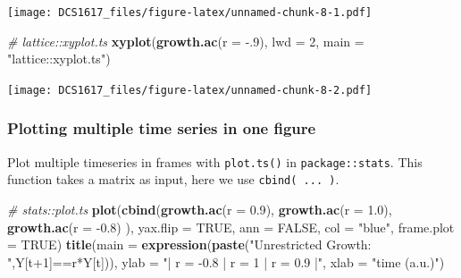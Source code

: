 \documentclass[]{book}
\newenvironment{Shaded}{\begin{snugshade}}{\end{snugshade}}
\newcommand{\KeywordTok}[1]{\textcolor[rgb]{0.13,0.29,0.53}{\textbf{{#1}}}}
\newcommand{\DataTypeTok}[1]{\textcolor[rgb]{0.13,0.29,0.53}{{#1}}}
\newcommand{\DecValTok}[1]{\textcolor[rgb]{0.00,0.00,0.81}{{#1}}}
\newcommand{\FloatTok}[1]{\textcolor[rgb]{0.00,0.00,0.81}{{#1}}}
\newcommand{\StringTok}[1]{\textcolor[rgb]{0.31,0.60,0.02}{{#1}}}
\newcommand{\CommentTok}[1]{\textcolor[rgb]{0.56,0.35,0.01}{\textit{{#1}}}}
\newcommand{\OtherTok}[1]{\textcolor[rgb]{0.56,0.35,0.01}{{#1}}}
\newcommand{\NormalTok}[1]{{#1}}
\begin{document}
\texttt{[image: DCS1617\_files/figure-latex/unnamed-chunk-8-1.pdf]}

\begin{Shaded}
\begin{Highlighting}[]
\CommentTok{# lattice::xyplot.ts}
\KeywordTok{xyplot}\NormalTok{(}\KeywordTok{growth.ac}\NormalTok{(}\DataTypeTok{r =} \NormalTok{-.}\DecValTok{9}\NormalTok{), }\DataTypeTok{lwd =} \DecValTok{2}\NormalTok{, }\DataTypeTok{main =} \StringTok{"lattice::xyplot.ts"}\NormalTok{)}
\end{Highlighting}
\end{Shaded}

\texttt{[image: DCS1617\_files/figure-latex/unnamed-chunk-8-2.pdf]}

\subsubsection*{Plotting multiple time series in one
figure}\label{plotting-multiple-time-series-in-one-figure}

Plot multiple timeseries in frames with \texttt{plot.ts()} in
\texttt{package::stats}. This function takes a matrix as input, here we
use \texttt{cbind(\ ...\ )}.

\begin{Shaded}
\begin{Highlighting}[]
\CommentTok{# stats::plot.ts  }
\KeywordTok{plot}\NormalTok{(}\KeywordTok{cbind}\NormalTok{(}\KeywordTok{growth.ac}\NormalTok{(}\DataTypeTok{r =}  \FloatTok{0.9}\NormalTok{),}
           \KeywordTok{growth.ac}\NormalTok{(}\DataTypeTok{r =}  \FloatTok{1.0}\NormalTok{), }
           \KeywordTok{growth.ac}\NormalTok{(}\DataTypeTok{r =} \NormalTok{-}\FloatTok{0.8}\NormalTok{)}
           \NormalTok{), }
     \DataTypeTok{yax.flip =} \OtherTok{TRUE}\NormalTok{, }\DataTypeTok{ann =} \OtherTok{FALSE}\NormalTok{, }\DataTypeTok{col =} \StringTok{"blue"}\NormalTok{, }\DataTypeTok{frame.plot =} \OtherTok{TRUE}\NormalTok{) }
\KeywordTok{title}\NormalTok{(}\DataTypeTok{main =} \KeywordTok{expression}\NormalTok{(}\KeywordTok{paste}\NormalTok{(}\StringTok{"Unrestricted Growth: "}\NormalTok{,Y[t}\DecValTok{+1}\NormalTok{]==r*Y[t])), }
      \DataTypeTok{ylab =} \StringTok{"|  r = -0.8  |  r = 1  |  r = 0.9  |"}\NormalTok{, }
      \DataTypeTok{xlab =} \StringTok{"time (a.u.)"}\NormalTok{)}
\end{Highlighting}
\end{Shaded}
\end{document}
